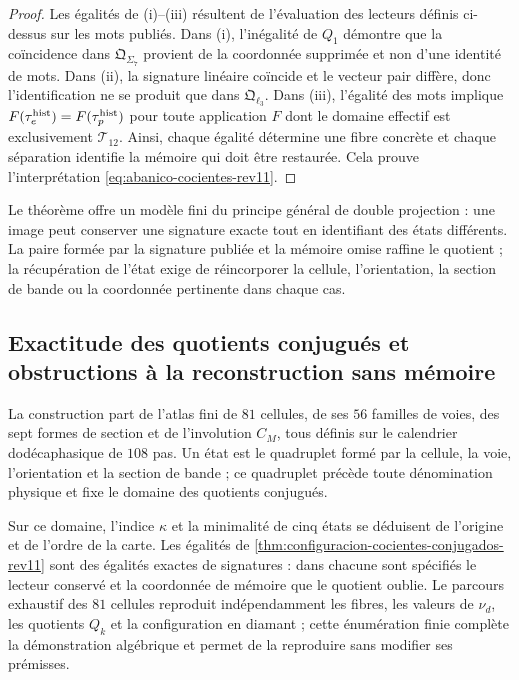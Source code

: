 \begin{proof}
Les égalités de (i)--(iii) résultent de l'évaluation des lecteurs définis
ci-dessus sur les mots publiés. Dans (i), l'inégalité de \(Q_1\)
démontre que la coïncidence dans \(\mathfrak Q_{\Sigma_7}\) provient de la
coordonnée supprimée et non d'une identité de mots. Dans (ii), la signature
linéaire coïncide et le vecteur pair diffère, donc l'identification ne se produit que
dans \(\mathfrak Q_{\ell_3}\). Dans (iii), l'égalité des mots implique
\(F(\tau_e^{\rm hist})=F(\tau_p^{\rm hist})\) pour toute application
\(F\) dont le domaine effectif est exclusivement \(\mathcal T_{12}\). Ainsi,
chaque égalité détermine une fibre concrète et chaque séparation identifie la
mémoire qui doit être restaurée. Cela prouve l'interprétation
\eqref{eq:abanico-cocientes-rev11}.
\end{proof}

Le théorème offre un modèle fini du principe général de double
projection : une image peut conserver une signature exacte tout en
identifiant des états différents. La paire formée par la signature publiée et
la mémoire omise raffine le quotient ; la récupération de l'état exige de
réincorporer la cellule, l'orientation, la section de bande ou la coordonnée pertinente
dans chaque cas.

\subsection{Exactitude des quotients conjugués et obstructions à la reconstruction sans mémoire}

La construction part de l'atlas fini de \(81\) cellules, de ses \(56\)
familles de voies, des sept formes de section et de l'involution \(C_M\), tous
définis sur le calendrier dodécaphasique de \(108\) pas. Un état
est le quadruplet formé par la cellule, la voie, l'orientation et la section de bande ; ce
quadruplet précède toute dénomination physique et fixe le domaine des
quotients conjugués.

Sur ce domaine, l'indice \(\kappa\) et la minimalité de cinq états se
déduisent de l'origine et de l'ordre de la carte. Les égalités de
\cref{thm:configuracion-cocientes-conjugados-rev11} sont des égalités exactes de
signatures : dans chacune sont spécifiés le lecteur conservé et la coordonnée de
mémoire que le quotient oublie. Le parcours exhaustif des \(81\) cellules
reproduit indépendamment les fibres, les valeurs de \(\nu_d\), les
quotients \(Q_k\) et la configuration en diamant ; cette énumération finie
complète la démonstration algébrique et permet de la reproduire sans modifier ses
prémisses.

